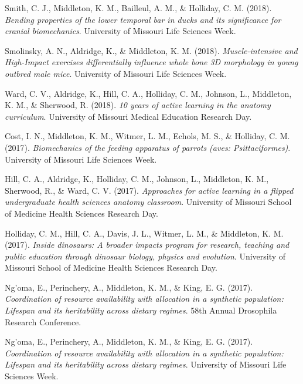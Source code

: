 \documentclass[11pt, a4paper]{awesome-cv}
\begin{document}
\leavevmode\hypertarget{ref-Smith2018-ms}{}%
Smith, C. J., Middleton, K. M., Bailleul, A. M., \& Holliday, C. M.
(2018). \emph{Bending properties of the lower temporal bar in ducks and
its significance for cranial biomechanics}. University of Missouri Life
Sciences Week.

\leavevmode\hypertarget{ref-Smolinsky2018-st}{}%
Smolinsky, A. N., Aldridge, K., \& Middleton, K. M. (2018).
\emph{Muscle-intensive and High-Impact exercises differentially
influence whole bone 3D morphology in young outbred male mice}.
University of Missouri Life Sciences Week.

\leavevmode\hypertarget{ref-Ward2018-ix}{}%
Ward, C. V., Aldridge, K., Hill, C. A., Holliday, C. M., Johnson, L.,
Middleton, K. M., \& Sherwood, R. (2018). \emph{10 years of active
learning in the anatomy curriculum}. University of Missouri Medical
Education Research Day.

\leavevmode\hypertarget{ref-Cost2017-qq}{}%
Cost, I. N., Middleton, K. M., Witmer, L. M., Echols, M. S., \&
Holliday, C. M. (2017). \emph{Biomechanics of the feeding apparatus of
parrots (aves: Psittaciformes)}. University of Missouri Life Sciences
Week.

\leavevmode\hypertarget{ref-Hill2017-jr}{}%
Hill, C. A., Aldridge, K., Holliday, C. M., Johnson, L., Middleton, K.
M., Sherwood, R., \& Ward, C. V. (2017). \emph{Approaches for active
learning in a flipped undergraduate health sciences anatomy classroom}.
University of Missouri School of Medicine Health Sciences Research Day.

\leavevmode\hypertarget{ref-Holliday2017-xi}{}%
Holliday, C. M., Hill, C. A., Davis, J. L., Witmer, L. M., \& Middleton,
K. M. (2017). \emph{Inside dinosaurs: A broader impacts program for
research, teaching and public education through dinosaur biology,
physics and evolution}. University of Missouri School of Medicine Health
Sciences Research Day.

\leavevmode\hypertarget{ref-Ngoma2017-oq}{}%
Ng'oma, E., Perinchery, A., Middleton, K. M., \& King, E. G. (2017).
\emph{Coordination of resource availability with allocation in a
synthetic population: Lifespan and its heritability across dietary
regimes}. 58th Annual Drosophila Research Conference.

\leavevmode\hypertarget{ref-Ngoma2017-vs}{}%
Ng'oma, E., Perinchery, A., Middleton, K. M., \& King, E. G. (2017).
\emph{Coordination of resource availability with allocation in a
synthetic population: Lifespan and its heritability across dietary
regimes}. University of Missouri Life Sciences Week.
\end{document}
